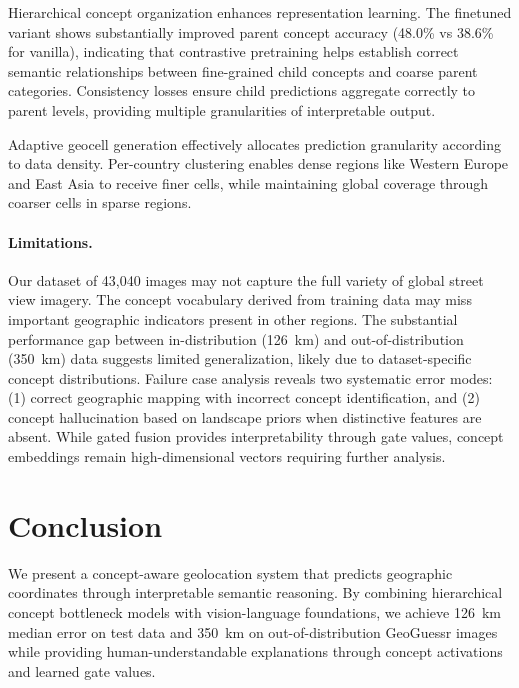 \documentclass{uva-inf-article}
\begin{document}
Hierarchical concept organization enhances representation learning. The finetuned variant shows substantially improved parent concept accuracy (48.0\% vs 38.6\% for vanilla), indicating that contrastive pretraining helps establish correct semantic relationships between fine-grained child concepts and coarse parent categories. Consistency losses ensure child predictions aggregate correctly to parent levels, providing multiple granularities of interpretable output.

Adaptive geocell generation effectively allocates prediction granularity according to data density. Per-country clustering enables dense regions like Western Europe and East Asia to receive finer cells, while maintaining global coverage through coarser cells in sparse regions.

\paragraph{Limitations.} Our dataset of 43,040 images may not capture the full variety of global street view imagery. The concept vocabulary derived from training data may miss important geographic indicators present in other regions. The substantial performance gap between in-distribution (126~km) and out-of-distribution (350~km) data suggests limited generalization, likely due to dataset-specific concept distributions. Failure case analysis reveals two systematic error modes: (1) correct geographic mapping with incorrect concept identification, and (2) concept hallucination based on landscape priors when distinctive features are absent. While gated fusion provides interpretability through gate values, concept embeddings remain high-dimensional vectors requiring further analysis. 


\section{Conclusion}
\label{sec:conclusion}

We present a concept-aware geolocation system that predicts geographic coordinates through interpretable semantic reasoning. By combining hierarchical concept bottleneck models with vision-language foundations, we achieve 126~km median error on test data and 350~km on out-of-distribution GeoGuessr images while providing human-understandable explanations through concept activations and learned gate values.
\end{document}
